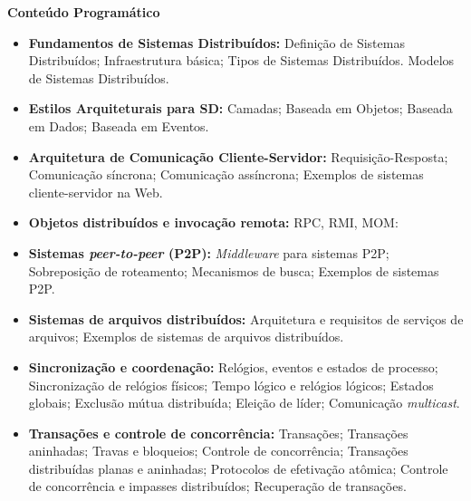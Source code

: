 
\begin{snugshade}\begin{center}\textbf{
    Conteúdo Programático
}\end{center}\end{snugshade}

\begin{itemize}

 \item \textbf{Fundamentos de Sistemas Distribuídos:} Definição de Sistemas Distribuídos; Infraestrutura básica; Tipos de Sistemas Distribuídos. Modelos de Sistemas Distribu\'idos.

 \item \textbf{Estilos Arquiteturais para SD:} Camadas; Baseada em Objetos; Baseada em Dados; Baseada em Eventos.

 \item \textbf{Arquitetura de Comunicação Cliente-Servidor:} Requisição-Resposta; Comunicação síncrona; Comunicação assíncrona; Exemplos de sistemas cliente-servidor na Web.
  
 \item \textbf{Objetos distribu\'idos e invoca\c{c}\~ao remota:} RPC, RMI, MOM:

 \item \textbf{Sistemas \textit{peer-to-peer} (P2P):} \textit{Middleware} para sistemas P2P; Sobreposi\c{c}\~ao de roteamento; Mecanismos de busca; Exemplos de sistemas P2P.

 \item \textbf{Sistemas de arquivos distribuídos:} Arquitetura e requisitos de servi\c{c}os de arquivos; Exemplos de sistemas de arquivos distribu\'idos.

 \item \textbf{Sincronização e coordena\c{c}\~ao:} Rel\'ogios, eventos e estados de processo; Sincroniza\c{c}\~ao de rel\'ogios f\'isicos; Tempo l\'ogico e rel\'ogios l\'ogicos; Estados globais; Exclus\~ao m\'utua distribu\'ida; Elei\c{c}\~ao de l\'ider; Comunica\c{c}\~ao \textit{multicast}.

 \item \textbf{Transações e controle de concorr\^encia:} Transa\c{c}\~oes; Transa\c{c}\~oes aninhadas; Travas e bloqueios; Controle de concorr\^encia; Transa\c{c}\~oes distribu\'idas planas e aninhadas; Protocolos de efetiva\c{c}\~ao at\^omica; Controle de concorr\^encia e impasses distribu\'idos; Recupera\c{c}\~ao de transa\c{c}\~oes.


\end{itemize}
